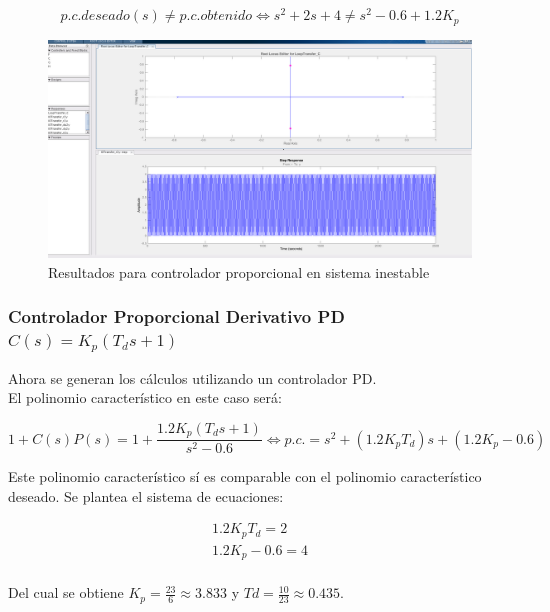 \documentclass{report}
\begin{document}
\begin{equation*}
    p.c.deseado(s) \neq p.c.obtenido \Leftrightarrow s^2+2s+4 \neq s^2-0.6 + 1.2 K_p
\label{Eq:12}
\end{equation*}

\begin{figure}[h!]
    \centering  
    \includegraphics[width=1\textwidth]{P2_P.png}
    \caption{Resultados para controlador proporcional en sistema inestable}
    \label{F:P2_P}
\end{figure}

\subsubsection{Controlador Proporcional Derivativo PD \(C(s) = K_p(T_ds+1)\)}

Ahora se generan los cálculos utilizando un controlador PD. \\

El polinomio característico en este caso será:

\begin{equation*}
    1+C(s)P(s)= 1+ \frac{1.2K_p(T_ds+1)}{s^2-0.6} \Leftrightarrow p.c. = s^2+(1.2K_pT_d)s+(1.2K_p-0.6)
    \label{Eq:12}
\end{equation*}


Este polinomio característico sí es comparable con el polinomio característico deseado. Se plantea el sistema de ecuaciones:


\begin{eqnarray*}
    1.2K_pT_d  = 2 \\
    1.2K_p-0.6 = 4 \\
\end{eqnarray*}

Del cual se obtiene \(K_p = \frac{23}{6} \approx 3.833\) y \(Td = \frac{10}{23} \approx 0.435\).\\
\end{document}
